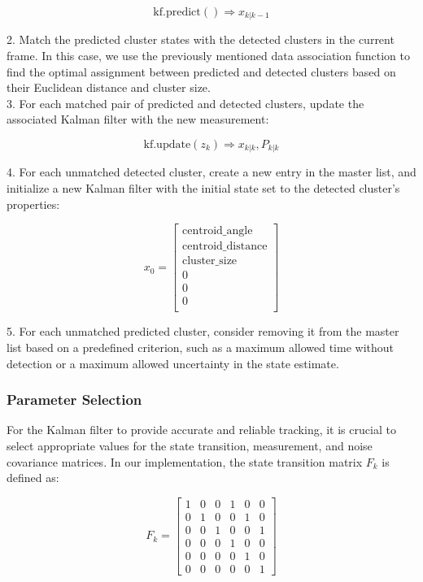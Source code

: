 \documentclass[journal]{IEEEtran} %
\begin{document}
   \[
   \mathrm{kf.predict()} \Rightarrow x_{k|k-1}
   \]

2. Match the predicted cluster states with the detected clusters in the current frame. In this case, we use the previously mentioned data association function to find the optimal assignment between predicted and detected clusters based on their Euclidean distance and cluster size.\\

3. For each matched pair of predicted and detected clusters, update the associated Kalman filter with the new measurement:

   \[
   \mathrm{kf.update}(z_k) \Rightarrow x_{k|k}, P_{k|k}
   \]

4. For each unmatched detected cluster, create a new entry in the master list, and initialize a new Kalman filter with the initial state set to the detected cluster's properties:

\[
x_0 = \begin{bmatrix}
\text{centroid\_angle} \\
\text{centroid\_distance} \\
\text{cluster\_size} \\
0 \\
0 \\
0\\
\end{bmatrix}
\]

5. For each unmatched predicted cluster, consider removing it from the master list based on a predefined criterion, such as a maximum allowed time without detection or a maximum allowed uncertainty in the state estimate.

\subsubsection{Parameter Selection}

For the Kalman filter to provide accurate and reliable tracking, it is crucial to select appropriate values for the state transition, measurement, and noise covariance matrices. In our implementation, the state transition matrix $F_k$ is defined as:

\[
F_k = \begin{bmatrix}
1 & 0 & 0 & 1 & 0 & 0 \\
0 & 1 & 0 & 0 & 1 & 0 \\
0 & 0 & 1 & 0 & 0 & 1 \\
0 & 0 & 0 & 1 & 0 & 0 \\
0 & 0 & 0 & 0 & 1 & 0 \\
0 & 0 & 0 & 0 & 0 & 1
\end{bmatrix}
\]
\end{document}
